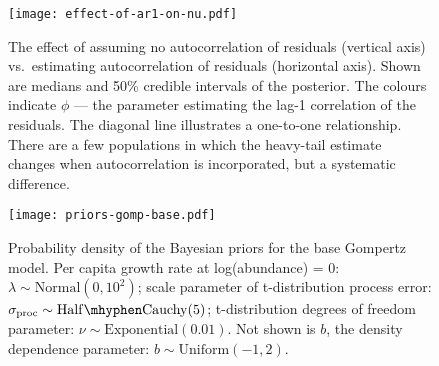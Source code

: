 \documentclass[11pt]{article}
\begin{document}
\begin{figure}[htbp]
\begin{center}
\texttt{[image: effect-of-ar1-on-nu.pdf]}
\caption{The effect of assuming no autocorrelation of residuals (vertical axis) vs.\ estimating autocorrelation of residuals (horizontal axis). Shown are medians and 50\% credible intervals of the posterior. The colours indicate $\phi$ --- the parameter estimating the lag-1 correlation of the residuals. The diagonal line illustrates a one-to-one relationship. There are a few populations in which the heavy-tail estimate changes when autocorrelation is incorporated, but a systematic difference.}
\label{fig:ar1}
\end{center}
\end{figure}

\clearpage

\begin{figure}[htbp]
\begin{center}
\texttt{[image: priors-gomp-base.pdf]} \caption{Probability
  density of the Bayesian priors for the base Gompertz model. Per capita growth
  rate at log(abundance) = 0: $\lambda \sim \mathrm{Normal}(0, 10^2)$; scale
  parameter of t-distribution process error: $\sigma_\mathrm{proc} \sim \mathrm{Half\mhyphen
    Cauchy} (5)$; t-distribution degrees of freedom parameter: $\nu \sim
  \mathrm{Exponential}(0.01)$. Not shown is $b$, the density dependence
  parameter: $b \sim \mathrm{Uniform}(-1, 2)$.}



\label{fig:priors}
\end{center}
\end{figure}
\end{document}
